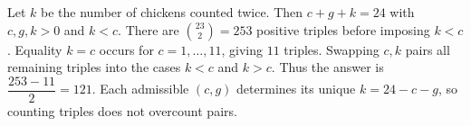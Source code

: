 Let $k$ be the number of chickens counted twice. Then $c+g+k=24$ with $c,g,k>0$ and $k<c$. There are $\binom{23}{2}=253$ positive triples before imposing $k<c$. Equality $k=c$ occurs for $c=1,\ldots,11$, giving $11$ triples. Swapping $c,k$ pairs all remaining triples into the cases $k<c$ and $k>c$. Thus the answer is $\boxed{\dfrac{253-11}{2}=121}$. Each admissible $(c,g)$ determines its unique $k=24-c-g$, so counting triples does not overcount pairs.
